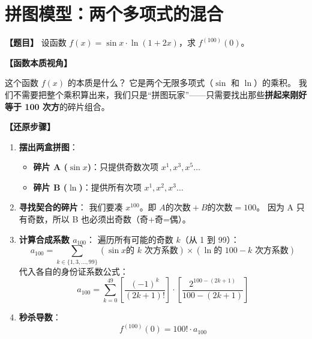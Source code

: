 \documentclass[UTF8, a4paper, 12pt]{article}
\newenvironment{essence}{
    \par\vspace{0.5em}\noindent
    \textbf{\color{purple}【函数本质视角】}
    \itshape
}{
    \par\vspace{0.5em}
}
\begin{document}
\vspace{2em}
\hrulefill
\vspace{2em}

\section{拼图模型：两个多项式的混合}

\textbf{【题目】}
设函数 $f(x) = \sin x \cdot \ln(1+2x)$，求 $f^{(100)}(0)$。

\begin{essence}
这个函数 $f(x)$ 的本质是什么？
它是两个无限多项式（$\sin$ 和 $\ln$）的乘积。
我们不需要把整个乘积算出来，我们只是“拼图玩家”——只需要找出那些\textbf{拼起来刚好等于 100 次方}的碎片组合。
\end{essence}

\textbf{【还原步骤】}
\begin{enumerate}
    \item \textbf{摆出两盒拼图}：
    \begin{itemize}
        \item \textbf{碎片 A ($\sin x$)}：只提供奇数次项 $x^1, x^3, x^5 \dots$
        \item \textbf{碎片 B ($\ln$)}：提供所有次项 $x^1, x^2, x^3 \dots$
    \end{itemize}
    
    \item \textbf{寻找契合的碎片}：
    我们要凑 $x^{100}$。即 $A \text{的次数} + B \text{的次数} = 100$。
    因为 A 只有奇数，所以 B 也必须出奇数（奇+奇=偶）。
    
    \item \textbf{计算合成系数 $a_{100}$}：
    遍历所有可能的奇数 $k$（从 1 到 99）：
    \[
    a_{100} = \sum_{k \in \{1,3,\dots,99\}} \left( \sin x \text{的 } k \text{ 次方系数} \right) \times \left( \ln \text{的 } 100-k \text{ 次方系数} \right)
    \]
    代入各自的身份证系数公式：
    \[
    a_{100} = \sum_{k=0}^{49} \left[ \dfrac{(-1)^k}{(2k+1)!} \right] \cdot \left[ \dfrac{2^{100-(2k+1)}}{100-(2k+1)} \right]
    \]
    
    \item \textbf{秒杀导数}：
    \[ f^{(100)}(0) = 100! \cdot a_{100} \]
\end{enumerate}
\end{document}
